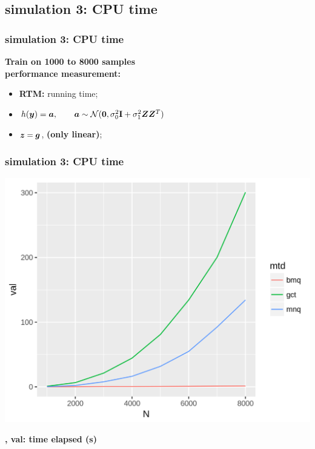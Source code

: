 \documentclass{beamer}
\begin{document}
\subsection{simulation 3: CPU time}
\begin{frame}\frametitle{simulation 3: CPU time}
  \textbf{Train on 1000 to 8000 samples} \\
  {\color{blue}\textbf{performance measurement:}}
  \begin{itemize}
  \item \textbf{RTM:} running time;
  \end{itemize}
  \begin{itemize}
  \item $h({\bm{y}})={\bm{a}}, \qquad {\bm{a}} \sim \mathcal{N}(\bm{0}, \sigma_0^2\textbf{I} + \sigma_1^2{\bm{Z}}{\bm{Z}}^T)$
  \item ${\bm{z}} = {\bm{g}}$, \textbf{(only linear)};
  \end{itemize}
\end{frame}
\begin{frame}\frametitle{simulation 3: CPU time}
  \centerline{\includegraphics[width=.8\linewidth]{img/ukb_rtm}}
  \textbf{\color{blue}{N: sample sizes}, val: time elapsed (s)}
\end{frame}
\end{document}
